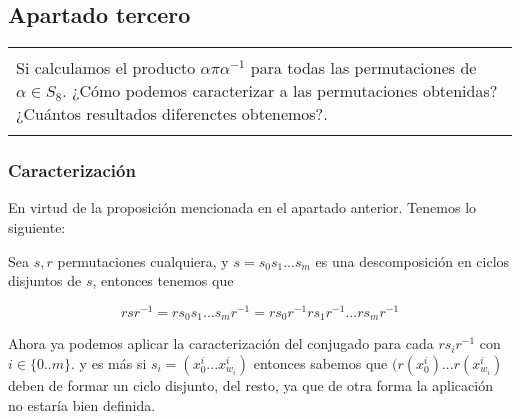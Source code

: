 \documentclass[12pt]{article}
\newenvironment{micaja}
{
    \begin{center}
    \begin{tabular}{|p{0.9\textwidth}|}
    \hline\\
    }   
    {   
    \\\\\hline
    \end{tabular} 
    \end{center}
    }
\begin{document}
\subsection{Apartado tercero}
\begin{micaja}
Si calculamos el producto $\alpha \pi \alpha^{-1}$ para todas las permutaciones de $\alpha \in S_8.$ ¿Cómo podemos caracterizar a las permutaciones obtenidas? ¿Cuántos resultados diferenctes obtenemos?.
\end{micaja}

\subsubsection*{Caracterización}
En virtud de la proposición mencionada en el apartado anterior.
Tenemos lo siguiente:

Sea $s,r$  permutaciones cualquiera, y $s = s_0 s_1 ...  s_m$ es una descomposición en ciclos disjuntos de $s$, entonces tenemos que

$$r s r^{-1} =r s_0 s_1 ...  s_m r^{-1} = r s_0 r^{-1} r s_1 r^{-1} ... r s_m r^{-1} $$

Ahora ya podemos aplicar la caracterización del conjugado para cada $r s_i r^{-1}$ con $i \in \{0..m\}.$ y es más si $s_i = (x_0^i... x_{w_i}^i)$ entonces sabemos que $(r(x_0^i)... r(x_{w_i}^i)$ deben de formar un ciclo disjunto, del resto, ya que de otra forma la aplicación no estaría bien definida. 
\end{document}
